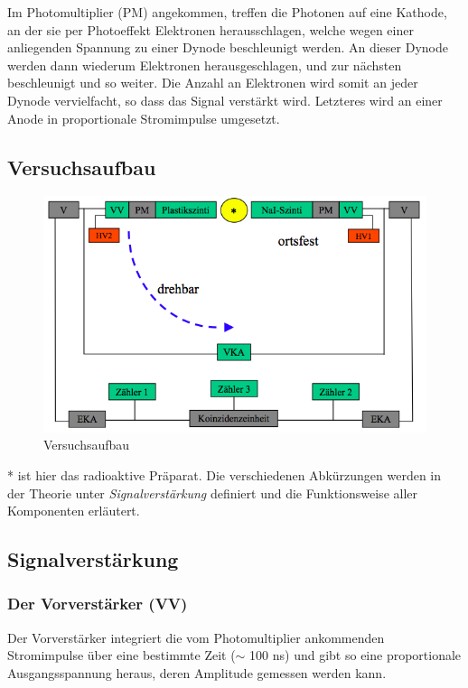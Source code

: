 
Im Photomultiplier (PM) angekommen, treffen die Photonen auf eine Kathode, an der sie per Photoeffekt Elektronen herausschlagen, welche wegen einer anliegenden Spannung zu einer Dynode beschleunigt werden. An dieser Dynode werden dann wiederum Elektronen herausgeschlagen, und zur nächsten beschleunigt und so weiter. Die Anzahl an Elektronen wird somit an jeder Dynode vervielfacht, so dass das Signal verstärkt wird. Letzteres wird an einer Anode in proportionale Stromimpulse umgesetzt.

\subsection{Versuchsaufbau}

\begin{figure}[H]
\centering \includegraphics[width = \textwidth]{Bilder/Aufbau.png}
\caption{Versuchsaufbau}
\end{figure}

* ist hier das radioaktive Präparat. Die verschiedenen Abkürzungen werden in der Theorie unter \emph{Signalverstärkung} definiert und die Funktionsweise aller Komponenten erläutert.

\subsection{Signalverstärkung}

\subsubsection{Der Vorverstärker (VV)}

Der Vorverstärker integriert die vom Photomultiplier ankommenden Stromimpulse über eine bestimmte Zeit ($\sim$ 100 ns) und gibt so eine proportionale Ausgangsspannung heraus, deren Amplitude gemessen werden kann.


